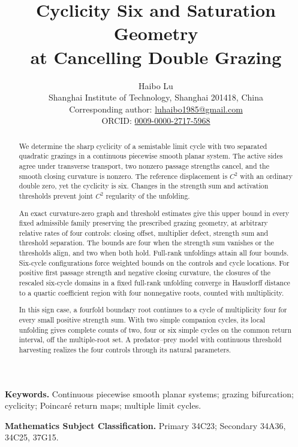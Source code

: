\documentclass[11pt]{article}
\title{Cyclicity Six and Saturation Geometry\\at Cancelling Double Grazing}
\author{Haibo Lu\\[2pt]
\small Shanghai Institute of Technology, Shanghai 201418, China\\
\small Corresponding author: \href{mailto:luhaibo1985@gmail.com}{luhaibo1985@gmail.com}\\
\small ORCID: \href{https://orcid.org/0009-0000-2717-5968}{0009-0000-2717-5968}}
\date{}
\theoremstyle{definition}
\theoremstyle{remark}
\numberwithin{equation}{section}
\begin{document}
\maketitle
\begin{abstract}
We determine the sharp cyclicity of a semistable limit cycle with two
separated quadratic grazings in a continuous piecewise smooth planar system.
The active sides agree under transverse transport, two nonzero passage
strengths cancel, and the smooth closing curvature is nonzero. The reference
displacement is $C^2$ with an ordinary double zero, yet the cyclicity is six.
Changes in the strength sum and activation thresholds prevent joint $C^2$
regularity of the unfolding.

An exact curvature-zero graph and threshold estimates give this upper bound
in every fixed admissible family preserving the prescribed grazing geometry,
at arbitrary relative rates of four controls: closing offset, multiplier
defect, strength sum and threshold separation. The bounds are four when the
strength sum vanishes or the thresholds align, and two when both hold.
Full-rank unfoldings attain all four bounds. Six-cycle configurations force
weighted bounds on the controls and cycle locations. For positive first
passage strength and negative closing curvature, the closures of the
rescaled six-cycle domains in a fixed full-rank unfolding converge in
Hausdorff distance to a quartic coefficient region with four nonnegative
roots, counted with multiplicity.

In this sign case, a fourfold boundary root continues to a cycle of
multiplicity four for every small positive strength sum. With two simple
companion cycles, its local unfolding gives complete counts of two, four or
six simple cycles on the common return interval, off the multiple-root set.
A predator--prey model with continuous threshold harvesting realizes the
four controls through its natural parameters.
\end{abstract}
\noindent\textbf{Keywords.} Continuous piecewise smooth planar systems;
grazing bifurcation; cyclicity; Poincar\'e return maps;
multiple limit cycles.
\par\smallskip
\noindent\textbf{Mathematics Subject Classification.}
Primary 34C23; Secondary 34A36, 34C25, 37G15.
\par\smallskip






\appendix



\end{document}
